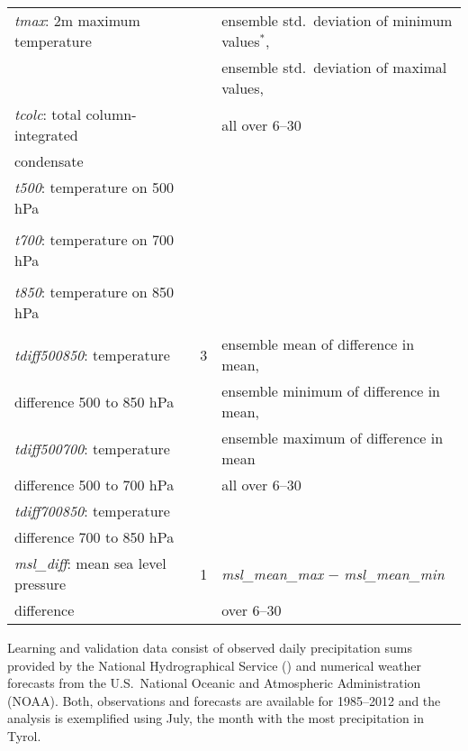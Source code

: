 \documentclass[aoas, preprint]{imsart}
\numberwithin{equation}{subsection}
\begin{document}
\begin{table}[t!]
\begin{minipage}{\textwidth}
\begin{tabular}{ l  c  l }
\emph{tmax}: 2m maximum temperature     &   & ensemble std.\ deviation of minimum values$^*$,\\
\hspace*{1.15cm}                          &   & ensemble std.\ deviation of maximal values,\\
\emph{tcolc}: total column-integrated   &   & \qquad all over 6--30 \\
\hspace*{0.95cm} condensate               &   & \\
\emph{t500}: temperature on 500 hPa     &   & \\
\hspace*{1cm}                             &   & \\
\emph{t700}: temperature on 700 hPa     &   & \\
\hspace*{1cm}                             &   & \\
\emph{t850}: temperature on 850 hPa     &   & \\
\hspace{1cm}                              &   & \\
\hline
\emph{tdiff500850}: temperature         & 3 & ensemble mean of difference in mean,\\
\hspace*{\fill} difference 500 to 850 hPa &   & ensemble minimum of difference in mean,\\
\emph{tdiff500700}: temperature         &   & ensemble maximum of difference in mean\\
\hspace*{\fill} difference 500 to 700 hPa &   & \qquad all over 6--30 \\
\emph{tdiff700850}: temperature         &   & \\
\hspace*{\fill} difference 700 to 850 hPa &   & \\
\hline
\emph{msl{\_}diff}: mean sea level pressure & 1 & \emph{msl{\_}mean{\_}max} $-$ \emph{msl{\_}mean{\_}min}\\
\hspace{1.6cm} difference            &   & \qquad over 6--30 \\
\hline
\end{tabular}
\end{minipage} 
\end{table}

Learning and validation data consist of observed 
daily precipitation sums provided by the National Hydrographical Service 
(\citealp{ehyd}) and numerical weather forecasts from the U.S.~National
Oceanic and Atmospheric Administration (NOAA).
Both, observations and forecasts are available for 1985--2012 and
the analysis is exemplified using July, the month with the most precipitation
in Tyrol.
\end{document}
